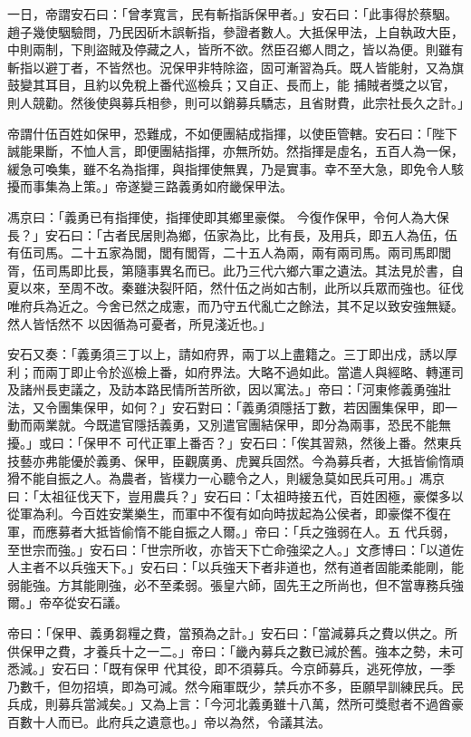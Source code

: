 \begin{pinyinscope}
 一日，帝謂安石曰：「曾孝寬言，民有斬指訴保甲者。」安石曰：「此事得於蔡駰。趙子幾使駰驗問，乃民因斫木誤斬指，參證者數人。大抵保甲法，上自執政大臣，中則兩制，下則盜賊及停藏之人，皆所不欲。然臣召鄉人問之，皆以為便。則雖有斬指以避丁者，不皆然也。況保甲非特除盜，固可漸習為兵。既人皆能射，又為旗鼓變其耳目，且約以免稅上番代巡檢兵；又自正、長而上，能
 捕賊者獎之以官，則人競勸。然後使與募兵相參，則可以銷募兵驕志，且省財費，此宗社長久之計。」



 帝謂什伍百姓如保甲，恐難成，不如便團結成指揮，以使臣管轄。安石曰：「陛下誠能果斷，不恤人言，即便團結指揮，亦無所妨。然指揮是虛名，五百人為一保，緩急可喚集，雖不名為指揮，與指揮使無異，乃是實事。幸不至大急，即免令人駭擾而事集為上策。」帝遂變三路義勇如府畿保甲法。



 馮京曰：「義勇已有指揮使，指揮使即其鄉里豪傑。
 今復作保甲，令何人為大保長？」安石曰：「古者民居則為鄉，伍家為比，比有長，及用兵，即五人為伍，伍有伍司馬。二十五家為閭，閭有閭胥，二十五人為兩，兩有兩司馬。兩司馬即閭胥，伍司馬即比長，第隨事異名而已。此乃三代六鄉六軍之遺法。其法見於書，自夏以來，至周不改。秦雖決裂阡陌，然什伍之尚如古制，此所以兵眾而強也。征伐唯府兵為近之。今舍已然之成憲，而乃守五代亂亡之餘法，其不足以致安強無疑。然人皆恬然不
 以因循為可憂者，所見淺近也。」



 安石又奏：「義勇須三丁以上，請如府界，兩丁以上盡籍之。三丁即出戍，誘以厚利；而兩丁即止令於巡檢上番，如府界法。大略不過如此。當遣人與經略、轉運司及諸州長吏議之，及訪本路民情所苦所欲，因以寓法。」帝曰：「河東修義勇強壯法，又令團集保甲，如何？」安石對曰：「義勇須隱括丁數，若因團集保甲，即一動而兩業就。今既遣官隱括義勇，又別遣官團結保甲，即分為兩事，恐民不能無擾。」或曰：「保甲不
 可代正軍上番否？」安石曰：「俟其習熟，然後上番。然東兵技藝亦弗能優於義勇、保甲，臣觀廣勇、虎翼兵固然。今為募兵者，大抵皆偷惰頑猾不能自振之人。為農者，皆樸力一心聽令之人，則緩急莫如民兵可用。」馮京曰：「太祖征伐天下，豈用農兵？」安石曰：「太祖時接五代，百姓困極，豪傑多以從軍為利。今百姓安業樂生，而軍中不復有如向時拔起為公侯者，即豪傑不復在軍，而應募者大抵皆偷惰不能自振之人爾。」帝曰：「兵之強弱在人。五
 代兵弱，至世宗而強。」安石曰：「世宗所收，亦皆天下亡命強梁之人。」文彥博曰：「以道佐人主者不以兵強天下。」安石曰：「以兵強天下者非道也，然有道者固能柔能剛，能弱能強。方其能剛強，必不至柔弱。張皇六師，固先王之所尚也，但不當專務兵強爾。」帝卒從安石議。



 帝曰：「保甲、義勇芻糧之費，當預為之計。」安石曰：「當減募兵之費以供之。所供保甲之費，才養兵十之一二。」帝曰：「畿內募兵之數已減於舊。強本之勢，未可悉減。」安石曰：「既有保甲
 代其役，即不須募兵。今京師募兵，逃死停放，一季乃數千，但勿招填，即為可減。然今廂軍既少，禁兵亦不多，臣願早訓練民兵。民兵成，則募兵當減矣。」又為上言：「今河北義勇雖十八萬，然所可獎慰者不過酋豪百數十人而已。此府兵之遺意也。」帝以為然，令議其法。




\end{pinyinscope}
